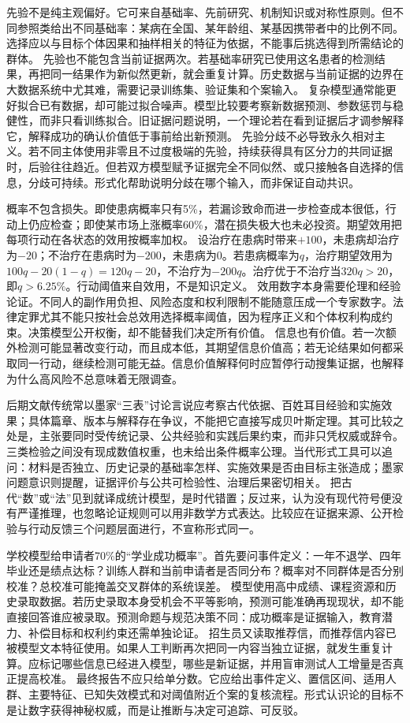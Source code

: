 先验不是纯主观偏好。它可来自基础率、先前研究、机制知识或对称性原则。但不同参照类给出不同基础率：某病在全国、某年龄组、某基因携带者中的比例不同。选择应以与目标个体因果和抽样相关的特征为依据，不能事后挑选得到所需结论的群体。 先验也不能包含当前证据两次。若基础率研究已使用这名患者的检测结果，再把同一结果作为新似然更新，就会重复计算。历史数据与当前证据的边界在大数据系统中尤其难，需要记录训练集、验证集和个案输入。 复杂模型通常能更好拟合已有数据，却可能过拟合噪声。模型比较要考察新数据预测、参数惩罚与稳健性，而非只看训练拟合。旧证据问题说明，一个理论若在看到证据后才调参解释它，解释成功的确认价值低于事前给出新预测。 先验分歧不必导致永久相对主义。若不同主体使用非零且不过度极端的先验，持续获得具有区分力的共同证据时，后验往往趋近。但若双方模型赋予证据完全不同似然、或只接触各自选择的信息，分歧可持续。形式化帮助说明分歧在哪个输入，而非保证自动共识。

概率不包含损失。即使患病概率只有5\%，若漏诊致命而进一步检查成本很低，行动上仍应检查；即使某市场上涨概率60\%，潜在损失极大也未必投资。期望效用把每项行动在各状态的效用按概率加权\parencite{jeffrey1983}。 设治疗在患病时带来$+100$，未患病却治疗为$-20$；不治疗在患病时为$-200$，未患病为0。若患病概率为$q$，治疗期望效用为$100q-20(1-q)=120q-20$，不治疗为$-200q$。治疗优于不治疗当$320q>20$，即$q>6.25\%$。行动阈值来自效用，不是知识定义。 效用数字本身需要伦理和经验论证。不同人的副作用负担、风险态度和权利限制不能随意压成一个专家数字。法律定罪尤其不能只按社会总效用选择概率阈值，因为程序正义和个体权利构成约束。决策模型公开权衡，却不能替我们决定所有价值。 信息也有价值。若一次额外检测可能显著改变行动，而且成本低，其期望信息价值高；若无论结果如何都采取同一行动，继续检测可能无益。信息价值解释何时应暂停行动搜集证据，也解释为什么高风险不总意味着无限调查。

后期文献传统常以墨家“三表”讨论言说应考察古代依据、百姓耳目经验和实施效果；具体篇章、版本与解释存在争议，不能把它直接写成贝叶斯定理\parencite{graham1989}。其可比较之处是，主张要同时受传统记录、公共经验和实践后果约束，而非只凭权威或辞令。 三类检验之间没有现成数值权重，也未给出条件概率公理。当代形式工具可以追问：材料是否独立、历史记录的基础率怎样、实施效果是否由目标主张造成；墨家问题意识则提醒，证据评价与公共可检验性、治理后果密切相关。 把古代“数”或“法”见到就译成统计模型，是时代错置；反过来，认为没有现代符号便没有严谨推理，也忽略论证规则可以用非数学方式表达。比较应在证据来源、公开检验与行动反馈三个问题层面进行，不宣称形式同一。

学校模型给申请者70\%的“学业成功概率”。首先要问事件定义：一年不退学、四年毕业还是绩点达标？训练人群和当前申请者是否同分布？概率对不同群体是否分别校准？总校准可能掩盖交叉群体的系统误差。 模型使用高中成绩、课程资源和历史录取数据。若历史录取本身受机会不平等影响，预测可能准确再现现状，却不能直接回答谁应被录取。预测命题与规范决策不同：成功概率是证据输入，教育潜力、补偿目标和权利约束还需单独论证。 招生员又读取推荐信，而推荐信内容已被模型文本特征使用。如果人工判断再次把同一内容当独立证据，就发生重复计算。应标记哪些信息已经进入模型，哪些是新证据，并用盲审测试人工增量是否真正提高校准。 最终报告不应只给单分数。它应给出事件定义、置信区间、适用人群、主要特征、已知失效模式和对阈值附近个案的复核流程。形式认识论的目标不是让数字获得神秘权威，而是让推断与决定可追踪、可反驳。

